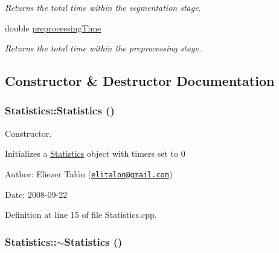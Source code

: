 \begin{CompactItemize}
\begin{CompactList}\small\item\em Returns the total time within the segmentation stage. \item\end{CompactList}\item 
\hypertarget{struct_statistics_57aa8970c666c415db6dcdd0cc3920f6}{
double \hyperlink{struct_statistics_57aa8970c666c415db6dcdd0cc3920f6}{preprocessingTime}}
\label{struct_statistics_57aa8970c666c415db6dcdd0cc3920f6}

\begin{CompactList}\small\item\em Returns the total time within the preprocessing stage. \item\end{CompactList}\end{CompactItemize}


\subsection{Constructor \& Destructor Documentation}
\hypertarget{struct_statistics_60ddd90a571ed4c3ce8c0f6317a36d63}{
\subsubsection[Statistics]{\setlength{\rightskip}{0pt plus 5cm}Statistics::Statistics ()}}
\label{struct_statistics_60ddd90a571ed4c3ce8c0f6317a36d63}


Constructor. 

Initializes a \hyperlink{struct_statistics}{Statistics} object with timers set to 0

\begin{Desc}
\item[Author:]Eliezer Talón (\href{mailto:elitalon@gmail.com}{\tt elitalon@gmail.com}) \end{Desc}
\begin{Desc}
\item[Date:]2008-09-22 \end{Desc}


Definition at line 15 of file Statistics.cpp.\hypertarget{struct_statistics_b68ede75479e44d5c35b78ec1284065b}{
\subsubsection[$\sim$Statistics]{\setlength{\rightskip}{0pt plus 5cm}Statistics::$\sim$Statistics ()}}
\label{struct_statistics_b68ede75479e44d5c35b78ec1284065b}


